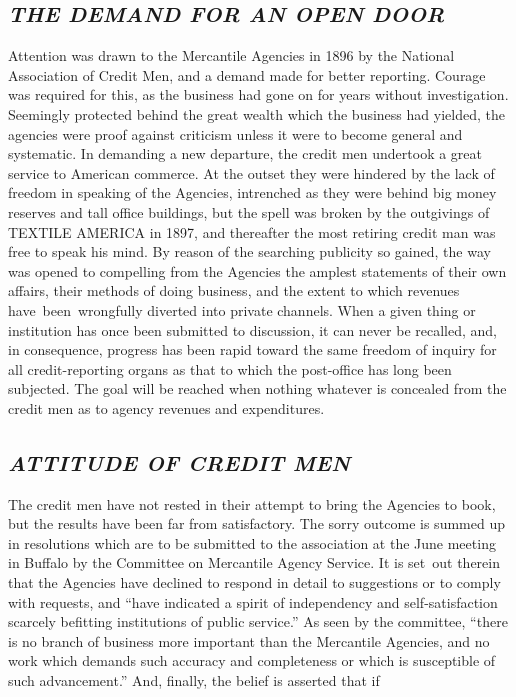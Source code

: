 \documentclass[openany,nobib]{tufte-book}
\begin{document}
\hypertarget{the-demand-for-an-open-door}{%
\subsection{\texorpdfstring{\emph{THE DEMAND FOR AN OPEN
DOOR}}{THE DEMAND FOR AN OPEN DOOR}}\label{the-demand-for-an-open-door}}

Attention was drawn to the Mercantile Agencies in 1896 by the National
Association of Credit Men, and a demand made for better reporting.
Courage was required for this, as the business had gone on for years
without investigation. Seemingly protected behind the great wealth which
the business had yielded, the agencies were proof against criticism
unless it were to become general and systematic. In demanding a new
departure, the credit men undertook a great service to American
commerce. At the outset they were hindered by the lack of freedom in
speaking of the Agencies, intrenched as they were behind big money
reserves and tall office buildings, but the spell was broken by the
outgivings of TEXTILE AMERICA in 1897, and thereafter the most retiring
credit man was free to speak his mind. By reason of the searching
publicity so gained, the way was opened to compelling from the Agencies
the amplest statements of their own affairs, their methods of doing
business, and the extent to which revenues have~been~wrongfully diverted
into private channels. When a given thing or institution has once been
submitted to discussion, it can never be recalled, and, in consequence,
progress has been rapid toward the same freedom of inquiry for all
credit-reporting organs as that to which the post-office has long been
subjected. The goal will be reached when nothing whatever is concealed
from the credit men as to agency revenues and expenditures.~

\hypertarget{attitude-of-credit-men}{%
\subsection{\texorpdfstring{\emph{ATTITUDE OF CREDIT
MEN}}{ATTITUDE OF CREDIT MEN}}\label{attitude-of-credit-men}}

The credit men have not rested in their attempt to bring the Agencies to
book, but the results have been far from satisfactory. The sorry outcome
is summed up in resolutions which are to be submitted to the association
at the June meeting in Buffalo by the Committee on Mercantile Agency
Service. It is set~out therein that the Agencies have declined to
respond in detail to suggestions or to comply with requests, and ``have
indicated a spirit of independency and self-satisfaction scarcely
befitting institutions of public service.'' As seen by the committee,
``there is no branch of business more important than the Mercantile
Agencies, and no work which demands such accuracy and completeness or
which is susceptible of such advancement.'' And, finally, the belief is
asserted that if
\end{document}
